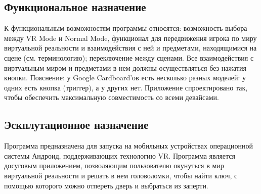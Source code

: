 \subsection{Функциональное назначение}
К функциональным возможностям программы относятся: возможность выбора между VR Mode и Normal Mode, функционал для передвижения игрока по миру виртуальной реальности и взаимодействия с ней и предметами, находящимися на сцене (см. терминологию); переключение между сценами. Все взаимодействия с виртуальным миром и предметами в нем должны осуществляться без нажатия кнопки. Пояснение: у Google Cardboard'ов есть несколько разных моделей: у одних есть кнопка (триггер), а у других нет. Приложение спроектировано так, чтобы обеспечить максимальную совместимость со всеми девайсами. 

\subsection{Эскплутационное назначение}
Программа предназначена для запуска на мобильных устройствах операционной системы Андроид, поддерживающих технологию VR. Программа является досуговым приложением, позволяющим пользователю окунуться в мир виртуальной реальности и решать в нем головоломки, чтобы найти ключ, с помощью которого можно отпереть дверь и выбраться из заперти. 